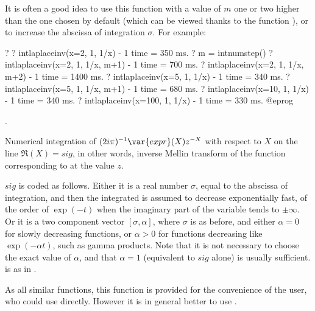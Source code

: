 It is often a good idea to use this function with a value of $m$ one or two
higher than the one chosen by default (which can be viewed thanks to the
function ), or to increase the abscissa of integration
$\sigma$. For example:

\bprog
? 
? intlaplaceinv(x=2, 1, 1/x) - 1
time = 350 ms.
? m = intnumstep()
? intlaplaceinv(x=2, 1, 1/x, m+1) - 1
time = 700 ms.
? intlaplaceinv(x=2, 1, 1/x, m+2) - 1
time = 1400 ms.
? intlaplaceinv(x=5, 1, 1/x) - 1
time = 340 ms.
? intlaplaceinv(x=5, 1, 1/x, m+1) - 1
time = 680 ms.
? intlaplaceinv(x=10, 1, 1/x) - 1
time = 340 ms.
? intlaplaceinv(x=100, 1, 1/x) - 1
time = 330 ms.
@eprog

.

\label{se:intmellininv}
Numerical
integration of $(2i\pi)^{-1}\var{expr}(X)z^{-X}$ with respect to $X$ on the
line $\Re(X)=sig$,  in other words, inverse Mellin transform of
the function corresponding to  at the value $z$.

$sig$ is coded as follows. Either it is a real number $\sigma$, equal to the
abscissa of integration, and then the integrated is assumed to decrease
exponentially fast, of the order of $\exp(-t)$ when the imaginary part of the
variable tends to $\pm\infty$. Or it is a two component vector
$[\sigma,\alpha]$, where $\sigma$ is as before, and either $\alpha=0$ for
slowly decreasing functions, or $\alpha>0$ for functions decreasing like
$\exp(-\alpha t)$, such as gamma products. Note that it is not necessary to
choose the exact value of $\alpha$, and that $\alpha=1$ (equivalent to $sig$
alone) is usually sufficient.  is as in .

As all similar functions, this function is provided for the convenience of
the user, who could use  directly. However it is in general
better to use .

